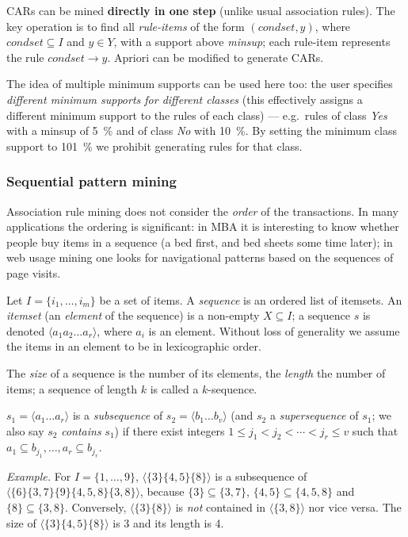 \documentclass[11pt,a4paper]{article}
\theoremstyle{definition}
\begin{document}
CARs can be mined \textbf{directly in one step} (unlike usual association rules). The key
operation is to find all \emph{rule-items} of the form $(\mathit{condset},y)$, where
$\mathit{condset}\subseteq I$ and $y\in Y$, with a support above \emph{minsup}; each rule-item
represents the rule $\mathit{condset}\to y$. Apriori can be modified to generate CARs.

The idea of multiple minimum supports can be used here too: the user specifies \emph{different
minimum supports for different classes} (this effectively assigns a different minimum support to
the rules of each class) --- e.g.\ rules of class \emph{Yes} with a minsup of 5~\% and of class
\emph{No} with 10~\%. By setting the minimum class support to 101~\% we prohibit generating rules
for that class.

\subsubsection{Sequential pattern mining}

Association rule mining does not consider the \emph{order} of the transactions. In many
applications the ordering is significant: in MBA it is interesting to know whether people buy
items in a sequence (a bed first, and bed sheets some time later); in web usage mining one looks
for navigational patterns based on the sequences of page visits.

\begin{defbox}
Let $I=\{i_1,\dots,i_m\}$ be a set of items. A \emph{sequence} is an ordered list of itemsets.
An \emph{itemset} (an \emph{element} of the sequence) is a non-empty $X\subseteq I$; a sequence
$s$ is denoted $\langle a_1a_2\dots a_r\rangle$, where $a_i$ is an element. Without loss of
generality we assume the items in an element to be in lexicographic order.

The \emph{size} of a sequence is the number of its elements, the \emph{length} the number of
items; a sequence of length $k$ is called a $k$-sequence.

$s_1=\langle a_1\dots a_r\rangle$ is a \emph{subsequence} of $s_2=\langle b_1\dots b_v\rangle$
(and $s_2$ a \emph{supersequence} of $s_1$; we also say $s_2$ \emph{contains} $s_1$) if there
exist integers $1\le j_1<j_2<\cdots<j_r\le v$ such that
$a_1\subseteq b_{j_1},\dots,a_r\subseteq b_{j_r}$.
\end{defbox}

\emph{Example.} For $I=\{1,\dots,9\}$, $\langle\{3\}\{4,5\}\{8\}\rangle$ is a subsequence of
$\langle\{6\}\{3,7\}\{9\}\{4,5,8\}\{3,8\}\rangle$, because $\{3\}\subseteq\{3,7\}$,
$\{4,5\}\subseteq\{4,5,8\}$ and $\{8\}\subseteq\{3,8\}$. Conversely,
$\langle\{3\}\{8\}\rangle$ is \emph{not} contained in $\langle\{3,8\}\rangle$ nor vice versa. The
size of $\langle\{3\}\{4,5\}\{8\}\rangle$ is 3 and its length is 4.
\end{document}

